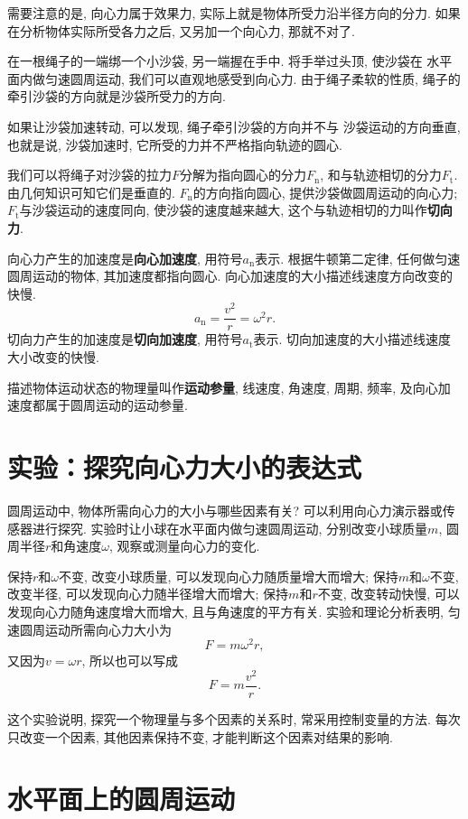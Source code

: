 \documentclass[11pt,a4paper]{ctexbook}
\begin{document}
需要注意的是, 向心力属于效果力, 实际上就是物体所受力沿半径方向的分力.
如果在分析物体实际所受各力之后, 又另加一个向心力, 那就不对了.

在一根绳子的一端绑一个小沙袋, 另一端握在手中. 将手举过头顶, 使沙袋在
水平面内做匀速圆周运动, 我们可以直观地感受到向心力. 由于绳子柔软的性质,
绳子的牵引沙袋的方向就是沙袋所受力的方向.

如果让沙袋加速转动, 可以发现, 绳子牵引沙袋的方向并不与
沙袋运动的方向垂直, 也就是说, 沙袋加速时, 它所受的力并不严格指向轨迹的圆心.

我们可以将绳子对沙袋的拉力$F$分解为指向圆心的分力$F_\text{n}$, 和与轨迹相切的分力$F_\text{t}$.
由几何知识可知它们是垂直的. $F_\text{n}$的方向指向圆心, 提供沙袋做圆周运动的向心力;
$F_\text{t}$与沙袋运动的速度同向, 使沙袋的速度越来越大, 这个与轨迹相切的力叫作\textbf{切向力}.

向心力产生的加速度是\textbf{向心加速度}, 用符号$a_\mathrm{n}$表示. 根据牛顿第二定律,
任何做匀速圆周运动的物体, 其加速度都指向圆心. 向心加速度的大小描述线速度方向改变的快慢.
$$a_\mathrm{n}=\frac{v^2}{r}={\omega}^{2}r.$$
切向力产生的加速度是\textbf{切向加速度}, 用符号$a_\mathrm{t}$表示.
切向加速度的大小描述线速度大小改变的快慢.

描述物体运动状态的物理量叫作\textbf{运动参量},
线速度, 角速度, 周期, 频率, 及向心加速度都属于圆周运动的运动参量.



\section{实验：探究向心力大小的表达式}

圆周运动中, 物体所需向心力的大小与哪些因素有关? 可以利用向心力演示器或传感器进行探究. 实验时让小球在水平面内做匀速圆周运动, 分别改变小球质量$m$, 圆周半径$r$和角速度$\omega$, 观察或测量向心力的变化.

保持$r$和$\omega$不变, 改变小球质量, 可以发现向心力随质量增大而增大; 保持$m$和$\omega$不变, 改变半径, 可以发现向心力随半径增大而增大; 保持$m$和$r$不变, 改变转动快慢, 可以发现向心力随角速度增大而增大, 且与角速度的平方有关. 实验和理论分析表明, 匀速圆周运动所需向心力大小为
$$F=m\omega^2r,$$
又因为$v=\omega r$, 所以也可以写成
$$F=m\frac{v^2}{r}.$$

这个实验说明, 探究一个物理量与多个因素的关系时, 常采用控制变量的方法. 每次只改变一个因素, 其他因素保持不变, 才能判断这个因素对结果的影响.

\section{水平面上的圆周运动}
\end{document}
